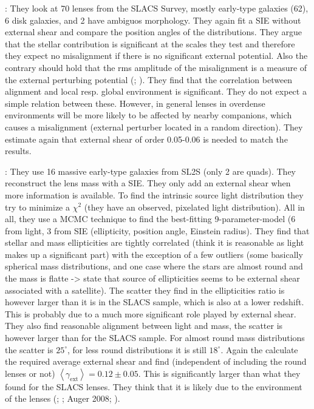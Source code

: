 \documentclass[10pt]{article}
\begin{document}
\textbf{\cite{2009ApJ...690..670T}}: They look at 70 lenses from the SLACS Survey, mostly early-type galaxies (62), 6 disk galaxies, and 2 have ambiguos morphology. They again fit a SIE without external shear and compare the position angles of the distributions. They argue that the stellar contribution is significant at the scales they test and therefore they expect no misalignment if there is no significant external potential. Also the contrary should hold that the rms amplitude of the misalignment is a measure of the external perturbing potential (\cite{1997ApJ...482..604K}; \cite{2006ApJ...649..599K}). They find that the correlation between alignment and local resp. global environment is significant. They do not expect a simple relation between these. However, in general lenses in overdense environments will be more likely to be affected by nearby companions, which causes a misalignment (external perturber located in a random direction). They estimate again that external shear of order 0.05-0.06 is needed to match the results.

\textbf{\cite{2012ApJ...761..170G}}: They use 16 massive early-type galaxies from SL2S (only 2 are quads). They reconstruct the lens mass with a SIE. They only add an external shear when more information is available. To find the intrinsic source light distribution they try to minimize a $\chi^{2}$ (they have an observed, pixelated light distribution). All in all, they use a MCMC technique to find the best-fitting 9-parameter-model  (6 from light, 3 from SIE (ellipticity, position angle, Einstein radius). They find that stellar and mass ellipticities are tightly correlated (think it is reasonable as light makes up a significant part) with the exception of a few outliers (some basically spherical mass distributions, and one case where the stars are almost round and the mass is flatte -> state that source of ellipticities seems to be external shear associated with a satellite). The scatter they find in the ellipticities ratio is however larger than it is in the SLACS sample, which is also at a lower redshift. This is probably due to a much more significant role played by external shear. They also find reasonable alignment between light and mass, the scatter is however larger than for the SLACS sample. For almost round mass distributions the scatter is $25^{\circ}$, for less round distributions it is still $18^{\circ}$. Again the calculate the required average external shear and find (independent of including the round lenses or not) $\left<\gamma_{\mathrm{ext}}\right>=0.12\pm0.05$. This is significantly larger than what they found for the SLACS lenses. They think that it is likely due to the environment of the lenses (\cite{2007AJ....134..668A}; \cite{2009ApJ...690..670T}; Auger 2008; \cite{2011ApJ...726...84W}).
\end{document}
